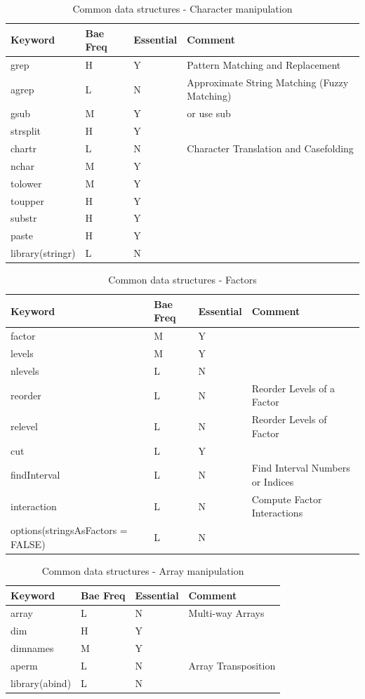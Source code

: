 \documentclass[11pt,]{krantz}
\theoremstyle{definition}
\theoremstyle{definition}
\theoremstyle{remark}
\begin{document}
\begin{longtable}[t]{llll}
\caption{\label{tab:knitchunk13}Common data structures - Character manipulation }\\
\toprule
Keyword & Bae Freq & Essential & Comment\\
\midrule
grep & H & Y & Pattern Matching and Replacement\\
agrep & L & N & Approximate String Matching (Fuzzy Matching)\\
gsub & M & Y & or use sub\\
strsplit & H & Y & \\
chartr & L & N & Character Translation and Casefolding\\
\addlinespace
nchar & M & Y & \\
tolower & M & Y & \\
toupper & H & Y & \\
substr & H & Y & \\
paste & H & Y & \\
library(stringr) & L & N & \\
\bottomrule
\end{longtable}

\begin{longtable}[t]{llll}
\caption{\label{tab:knitchunk14}Common data structures - Factors }\\
\toprule
Keyword & Bae Freq & Essential & Comment\\
\midrule
factor & M & Y & \\
levels & M & Y & \\
nlevels & L & N & \\
reorder & L & N & Reorder Levels of a Factor\\
relevel & L & N & Reorder Levels of Factor\\
\addlinespace
cut & L & Y & \\
findInterval & L & N & Find Interval Numbers or Indices\\
interaction & L & N & Compute Factor Interactions\\
options(stringsAsFactors = FALSE) & L & N & \\
\bottomrule
\end{longtable}

\begin{longtable}[t]{llll}
\caption{\label{tab:knitchunk15}Common data structures - Array manipulation}\\
\toprule
Keyword & Bae Freq & Essential & Comment\\
\midrule
array & L & N & Multi-way Arrays\\
dim & H & Y & \\
dimnames & M & Y & \\
aperm & L & N & Array Transposition\\
library(abind) & L & N & \\
\bottomrule
\end{longtable}
\end{document}
